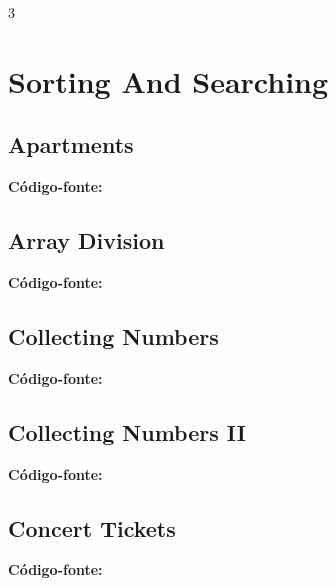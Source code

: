 \documentclass[8pt]{extarticle}
\begin{document}
\begin{multicols*}{3}

\section{Sorting And Searching}

\subsection{Apartments}
\begin{caixaenunciado}

\end{caixaenunciado}
\vspace{0.3cm}
\noindent\textbf{Código-fonte:}


\subsection{Array Division}
\begin{caixaenunciado}

\end{caixaenunciado}
\vspace{0.3cm}
\noindent\textbf{Código-fonte:}


\subsection{Collecting Numbers}
\begin{caixaenunciado}

\end{caixaenunciado}
\vspace{0.3cm}
\noindent\textbf{Código-fonte:}


\subsection{Collecting Numbers II}
\begin{caixaenunciado}

\end{caixaenunciado}
\vspace{0.3cm}
\noindent\textbf{Código-fonte:}


\subsection{Concert Tickets}
\begin{caixaenunciado}

\end{caixaenunciado}
\vspace{0.3cm}
\noindent\textbf{Código-fonte:}



\end{multicols*}
\end{document}
